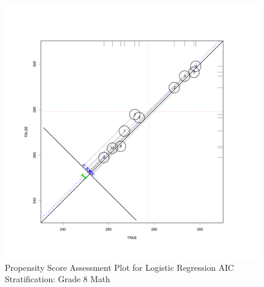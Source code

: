 \clearpage
\begin{figure}
\begin{center}
\includegraphics[height=.4\textheight,width=.4\textheight]{../Figures2009/g8math-circpsa10-AIC.pdf}
\caption{Propensity Score Assessment Plot for Logistic Regression AIC Stratification: Grade 8 Math}
\end{center}
\end{figure}



